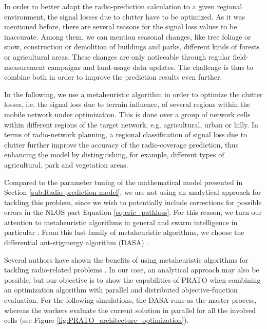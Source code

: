 In order to better adapt the radio-prediction calculation to a given
regional environment, the signal losses due to clutter have to be
optimized. As it was mentioned before, there are several reasons for
the signal loss values to be inaccurate. Among them, we can mention
seasonal changes, like tree foliage or snow, construction or demolition
of buildings and parks, different kinds of forests or agricultural
areas. These changes are only noticeable through regular field-measurement
campaigns and land-usage data updates. The challenge is thus to combine
both in order to improve the prediction results even further.

In the following, we use a metaheuristic algorithm in order to optimize
the clutter losses, i.e. the signal loss due to terrain influence,
of several regions within the mobile network under optimization. This
is done over a group of network cells within different regions of
the target network, e.g. agricultural, urban or hilly. In terms of
radio-network planning, a regional classification of signal loss due
to clutter further improve the accuracy of the radio-coverage prediction,
thus enhancing the model by distinguishing, for example, different
types of agricultural, park and vegetation areas.

Compared to the parameter tuning of the mathematical model presented
in Section \ref{sub:Radio-prediction-model}, we are not using an
analytical approach for tackling this problem, since we wish to potentially
include corrections for possible errors in the NLOS part Equation
\ref{eq:eric_pathloss}. For this reason, we turn our attention to
metaheuristic algorithms \cite{Talbi_Metaheuristics:2009} in general
and swarm intelligence in particular \cite{Kennedy_Swarm_intelligence:2006}.
From this last family of metaheuristic algorithms, we choose the differential
ant-stigmergy algorithm (DASA) \cite{Korosec-The_differential_ant_stigmergy_algorithm:2012}.

Several authors have shown the benefits of using metaheuristic algorithms
for tackling radio-related problems \cite{Benedicic_Balancing_downlink_uplink_soft_handover_areas_in_UMTS_networks:2012,Garcia-Lozano_Metaheuristic_procedure_to_optimize_transmission_delays_in_DVB-T_single_frequency_networks:2011,Huang_Online_propagation_model_correction_based_on_PSO_algorithm_in_LTE_SON_system:2012,Malla_Energy_efficient_resource_allocation_in_OFDMA_networks_using_ant_colony_optimization:2012}.
In our case, an analytical approach may also be possible, but our
objective is to show the capabilities of PRATO when combining an optimization
algorithm with parallel and distributed objective-function evaluation.
For the following simulations, the DASA runs as the master process,
whereas the workers evaluate the current solution in parallel for
all the involved cells (see Figure \ref{fig:PRATO_architecture_optimization}).



